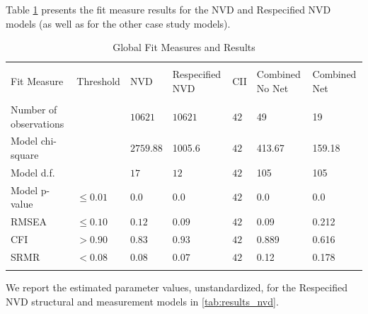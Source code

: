Table \ref{tab:results_fit_all} presents the fit measure results for the NVD  and Respecified NVD models (as well as for the other case study models).

\begin{table}
	\begin{center}	
		\caption{Global Fit Measures and Results}
			\label{tab:results_fit_all}
			\begin{tabular}{p{3cm}p{1cm}|p{2cm}p{2cm}p{2cm}p{2cm}p{2cm}}
				\\[-1.8ex]\hline 
				\hline \\[-1.8ex] 
				Fit Measure & Threshold & NVD	& Respecified NVD & CII	& Combined No Net  & Combined Net \\
				\hline \\[-1.8ex] 				
				Number of observations &  & $10621$  & $10621$ & $42$  & 49 & 19 \\				
				Model chi-square &  & $2759.88$ & 1005.6 & $42$ & 413.67 & 159.18\\				
				Model d.f. &  & $17$ & $12$ & $42$ & 105 & 105\\		
				Model p-value & $\leq 0.01$ & $0.0$ & $0.0$ & $42$ & $0.0$ & $0.0$\\
				RMSEA & $\leq 0.10$ &  $0.12$ &  $0.09$ & $42$ & 0.09 & 0.212 \\
				CFI & $> 0.90$ & $0.83$ & $0.93$  & $42$ & 0.889 & 0.616\\
				SRMR & $< 0.08$ & $0.08$ & $0.07$ & $42$& 0.12  & 0.178 \\
				\hline \\[-1.8ex] 				
			\end{tabular}
	\end{center}
\end{table}

We report the estimated parameter values, unstandardized, for the Respecified NVD structural and measurement models in \ref{tab:results_nvd}.

